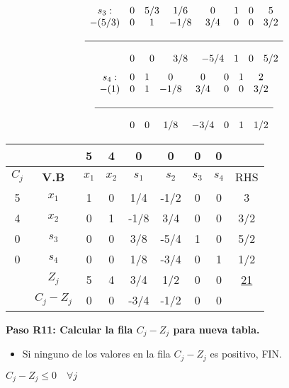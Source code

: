 \documentclass{templateNote}
\begin{document}
\vspace{0.5cm}
\begin{equation*}
    \begin{array}{cccccccc}
        s_3: & 0 & 5/3 & 1/6 & 0 & 1 & 0 & 5 \\
        -(5/3) & 0 & 1 & -1/8 & 3/4 & 0 & 0 & 3/2 \\
        \\ \hline \\
        & 0 & 0 & 3/8 & -5/4 & 1 & 0 & 5/2
    \end{array}
\end{equation*}
\vspace{0.5cm}
\begin{equation*}
    \begin{array}{cccccccc}
        s_4: & 0 & 1 & 0 & 0 & 0 & 1 & 2 \\
        -(1) & 0 & 1 & -1/8 & 3/4 & 0 & 0 & 3/2 \\
        \\ \hline \\
        & 0 & 0 & 1/8 & -3/4 & 0 & 1 & 1/2
    \end{array}
\end{equation*}
\begin{center}
    \begin{tabular}{|c|c|c|c|c|c|c|c|c|}
        \hline
        & & 5 & 4 & 0 & 0 & 0 & 0 & \\ \hline
        $C_j$ & \textbf{V.B} & $x_1$ & $x_2$ & $s_1$ & $s_2$ & $s_3$ & $s_4$ & RHS \\ \hline
        5 & $x_1$ & 1 & 0 & 1/4 & -1/2 & 0 & 0 & 3 \\ \hline
        4 & $x_2$ & 0 & 1 & -1/8 & 3/4 & 0 & 0 & 3/2 \\ \hline
        0 & $s_3$ & 0 & 0 & 3/8 & -5/4 & 1 & 0 & 5/2 \\ \hline
        0 & $s_4$ & 0 & 0 & 1/8 & -3/4 & 0 & 1 & 1/2 \\ \hline
        & $Z_j$ & 5 & 4 & 3/4 & 1/2 & 0 & 0 & \underline{21} \\ \hline
        & $C_j - Z_j$ & 0 & 0 & -3/4 & -1/2 & 0 & 0 & \\ \hline
    \end{tabular}
\end{center}
\textbf{Paso R11: Calcular la fila $C_j - Z_j$ para nueva tabla.}
\begin{itemize}
    \item Si ninguno de los valores en la fila $C_j - Z_j$ es positivo,  FIN.
\end{itemize}
\begin{center}
    $C_j - Z_j \leq 0 \quad \forall j$
\end{center}
\end{document}
